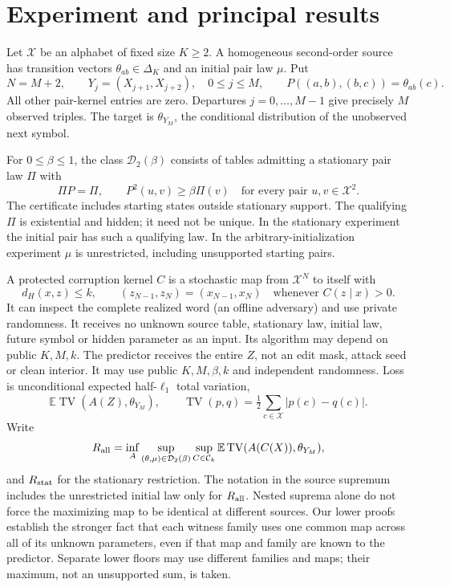 \documentclass[11pt]{article}
\theoremstyle{remark}\newtheorem{remark}[theorem]{Remark}
\newcommand{\TV}{\operatorname{TV}}
\newcommand{\E}{\mathbb E}
\newcommand{\1}{\mathbf 1}
\begin{document}
\section{Experiment and principal results}\label{sec:model}
Let $\mathcal X$ be an alphabet of fixed size $K\ge2$. A homogeneous second-order source has transition vectors $\theta_{ab}\in\Delta_K$ and an initial pair law $\mu$. Put
\[
 N=M+2,\qquad Y_j=(X_{j+1},X_{j+2}),\quad 0\le j\le M,
 \qquad P((a,b),(b,c))=\theta_{ab}(c).
\]
All other pair-kernel entries are zero. Departures $j=0,\ldots,M-1$ give precisely $M$ observed triples. The target is $\theta_{Y_M}$, the conditional distribution of the unobserved next symbol.

For $0\le\beta\le1$, the class $\mathcal D_2(\beta)$ consists of tables admitting a stationary pair law $\Pi$ with
\begin{equation}\label{eq:certificate}
 \Pi P=\Pi,\qquad P^2(u,v)\ge\beta\Pi(v)\quad\text{for every pair }u,v\in\mathcal X^2.
\end{equation}
The certificate includes starting states outside stationary support. The qualifying $\Pi$ is existential and hidden; it need not be unique. In the stationary experiment the initial pair has such a qualifying law. In the arbitrary-initialization experiment $\mu$ is unrestricted, including unsupported starting pairs.

A protected corruption kernel $C$ is a stochastic map from $\mathcal X^N$ to itself with
\[
 d_H(x,z)\le k,\qquad (z_{N-1},z_N)=(x_{N-1},x_N)
 \quad\text{whenever } C(z\mid x)>0.
\]
It can inspect the complete realized word (an offline adversary) and use private randomness. It receives no unknown source table, stationary law, initial law, future symbol or hidden parameter as an input. Its algorithm may depend on public $K,M,k$. The predictor receives the entire $Z$, not an edit mask, attack seed or clean interior. It may use public $K,M,\beta,k$ and independent randomness. Loss is unconditional expected half-$\ell_1$ total variation,
\[
 \E\TV(A(Z),\theta_{Y_M}),\qquad
 \TV(p,q)=\tfrac12\sum_{c\in\mathcal X}|p(c)-q(c)|.
\]
Write
\begin{equation}\label{eq:risk}
 R_{\rm all}=\inf_A\sup_{(\theta,\mu)\in\mathcal D_2(\beta)}\sup_{C\in\mathcal C_k}
 \E\TV(A(C(X)),\theta_{Y_M}),
\end{equation}
and $R_{\rm stat}$ for the stationary restriction. The notation in the source supremum includes the unrestricted initial law only for $R_{\rm all}$. Nested suprema alone do not force the maximizing map to be identical at different sources. Our lower proofs establish the stronger fact that each witness family uses one common map across all of its unknown parameters, even if that map and family are known to the predictor. Separate lower floors may use different families and maps; their maximum, not an unsupported sum, is taken.
\end{document}
